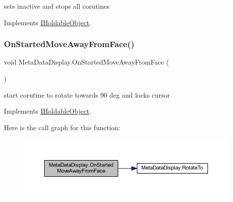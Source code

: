 sets inactive and stops all corutines 



Implements \mbox{\hyperlink{interface_i_holdable_object_abe7c5e5ed97fb5c908c91da5b8714f0e}{I\+Holdable\+Object}}.

\mbox{\label{class_meta_data_display_a98518b3d82ffd1e428cab9a2328fb018}} 
\subsubsection{\texorpdfstring{On\+Started\+Move\+Away\+From\+Face()}{OnStartedMoveAwayFromFace()}}
{\footnotesize\ttfamily void Meta\+Data\+Display.\+On\+Started\+Move\+Away\+From\+Face (\begin{DoxyParamCaption}{ }\end{DoxyParamCaption})}



start corutine to rotate towards 90 deg and locks cursor 



Implements \mbox{\hyperlink{interface_i_holdable_object_a75f802a9736db51e5e8d1568689dd11c}{I\+Holdable\+Object}}.

Here is the call graph for this function\+:
\nopagebreak
\begin{figure}[H]
\begin{center}
\leavevmode
\includegraphics[width=350pt]{class_meta_data_display_a98518b3d82ffd1e428cab9a2328fb018_cgraph}
\end{center}
\end{figure}
\mbox{\label{class_meta_data_display_aa0a9b9ca8243943104c82602e69a0541}} 

